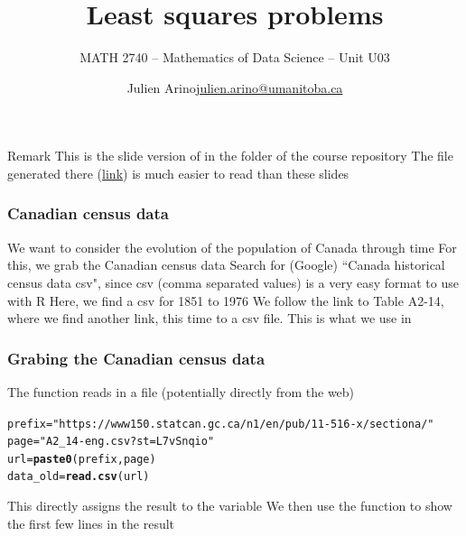 \documentclass[aspectratio=169]{beamer}\usepackage[]{graphicx}\usepackage[]{xcolor}
\subtitle{MATH 2740 -- Mathematics of Data Science -- Unit U03}
\author{\texorpdfstring{Julien Arino\newline\url{julien.arino@umanitoba.ca}}{Julien Arino}}
\institute{Department of Mathematics @ University of Manitoba}
\title{Least squares problems}
\makeatletter
\newcommand{\hlsng}[1]{\textcolor[rgb]{0.192,0.494,0.8}{#1}}%
\newcommand{\hldef}[1]{\textcolor[rgb]{0.345,0.345,0.345}{#1}}%
\newcommand{\hlkwb}[1]{\textcolor[rgb]{0.69,0.353,0.396}{#1}}%
\newcommand{\hlkwd}[1]{\textcolor[rgb]{0.737,0.353,0.396}{\textbf{#1}}}%
\newenvironment{kframe}{%
 \def\at@end@of@kframe{}%
 \ifinner\ifhmode%
  \def\at@end@of@kframe{\end{minipage}}%
  \begin{minipage}{\columnwidth}%
 \fi\fi%
 \def\FrameCommand##1{\hskip\@totalleftmargin \hskip-\fboxsep
 \colorbox{shadecolor}{##1}\hskip-\fboxsep
     \hskip-\linewidth \hskip-\@totalleftmargin \hskip\columnwidth}%
 \MakeFramed {\advance\hsize-\width
   \@totalleftmargin\z@ \linewidth\hsize
   \@setminipage}}%
 {\par\unskip\endMakeFramed%
 \at@end@of@kframe}
\newenvironment{knitrout}{}{} %
\makeatother
\begin{document}

\SStitlepage
\SSoutlinepage



\begin{frame}{Remark}
This is the slide version of  in the folder  of the course repository
\vfill
The  file generated there (\href{https://julien-arino.github.io/math-of-data-science/CODE/Canada-census-get-plot-data.html}{link}) is much easier to read than these slides
\end{frame}

\begin{frame}\frametitle{Canadian census data}
We want to consider the evolution of the population of Canada through time
\vfill
For this, we grab the Canadian census data
\vfill Search for (Google) ``Canada historical census data csv", since csv (comma separated values) is a very easy format to use with R
\vfill
Here, we find a csv for 1851 to 1976
\vfill
We follow the link to Table A2-14, where we find another link, this time to a csv file. This is what we use in 
\end{frame}


\begin{frame}[fragile]
\frametitle{Grabing the Canadian census data}
The function  reads in a file (potentially directly from the web)
\vfill
\begin{knitrout}
\color{fgcolor}\begin{kframe}
\begin{alltt}
\hldef{prefix} \hlkwb{=} \hlsng{"https://www150.statcan.gc.ca/n1/en/pub/11-516-x/sectiona/"}
\hldef{page} \hlkwb{=} \hlsng{"A2_14-eng.csv?st=L7vSnqio"}
\hldef{url} \hlkwb{=} \hlkwd{paste0}\hldef{(prefix, page)}
\hldef{data_old} \hlkwb{=} \hlkwd{read.csv}\hldef{(url)}
\end{alltt}


{\ttfamily\noindent\bfseries\color{errorcolor}{\#\# Error in `file()`:\\\#\# ! cannot open the connection to 'https://www150.statcan.gc.ca/n1/en/pub/11-516-x/sectiona/A2\_14-eng.csv?st=L7vSnqio'}}\end{kframe}
\end{knitrout}
\vfill
This directly assigns the result to the variable 
\vfill
We then use the function  to show the first few lines in the result
\end{frame}
\end{document}
